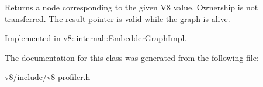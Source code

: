 Returns a node corresponding to the given V8 value. Ownership is not transferred. The result pointer is valid while the graph is alive. 

Implemented in \mbox{\hyperlink{classv8_1_1internal_1_1EmbedderGraphImpl_aa205df27c645b256ba9f5e8bbbb08497}{v8\+::internal\+::\+Embedder\+Graph\+Impl}}.



The documentation for this class was generated from the following file\+:\begin{DoxyCompactItemize}
\item 
v8/include/v8-\/profiler.\+h\end{DoxyCompactItemize}
